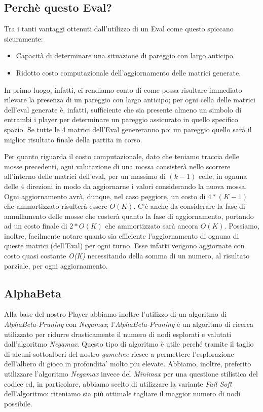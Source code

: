 \documentclass{article}
\begin{document}
\subsection{Perchè questo Eval?}
Tra i tanti vantaggi ottenuti dall'utilizzo di un Eval come questo spiccano sicuramente: 
\begin{itemize}
\item Capacità di determinare una situazione di pareggio con largo anticipo.
\item Ridotto costo computazionale dell'aggiornamento delle matrici generate.
\end{itemize}

In primo luogo, infatti, ci rendiamo conto di come possa risultare immediato rilevare la presenza di un pareggio con largo anticipo; per ogni cella delle matrici dell'eval generate è, infatti, sufficiente che sia presente almeno un simbolo di entrambi i player per determinare un pareggio assicurato in quello specifico spazio.
Se tutte le 4 matrici dell'Eval genereranno poi un pareggio quello sarà il miglior risultato finale della partita in corso.

\medskip

Per quanto riguarda il costo computazionale, dato che teniamo traccia delle mosse precedenti, ogni valutazione di una mossa consisterà nello scorrere all'interno delle matrici dell'eval, per un massimo di $(k-1)$ celle, in ognuna delle 4 direzioni in modo da aggiornarne i valori considerando la nuova mossa. \newline 
Ogni aggiornamento avrà, dunque, nel caso peggiore, un costo di $4 * (K - 1)$ che ammortizzato risulterà essere $O(K)$. \newline
C'è anche da considerare la fase di annullamento delle mosse che costerà quanto la fase di aggiornamento, portando ad un costo finale di $2 * O(K)$ che ammortizzato sarà ancora $O(K)$.\newline
\newline
Possiamo, inoltre, facilmente notare quanto sia efficiente l'aggiornamento di ognuna di queste matrici (dell'Eval) per ogni turno. Esse infatti vengono aggiornate con costo quasi costante \textit{O(K)}
necessitando della somma di un numero, al risultato parziale, per ogni aggiornamento.

\subsection{AlphaBeta}
Alla base del nostro Player abbiamo inoltre l'utilizzo di un algoritmo di \textit{AlphaBeta-Pruning} con \textit{Negamax}; l'\textit{AlphaBeta-Pruning} è un algoritmo di ricerca utilizzato per ridurre drasticamente il numero di nodi esplorati e valutati dall'algoritmo \textit{Negamax}.
Questo tipo di algoritmo è utile perché tramite il taglio di alcuni sottoalberi del nostro \textit{gametree} riesce a permettere l'esplorazione dell'albero di gioco in profondita' molto piu elevate. Abbiamo, inoltre, preferito utilizzare l'algoritmo \textit{Negamax} invece del \textit{Minimax} per una questione stilistica del codice ed, in particolare, abbiamo scelto di utilizzare la variante \textit{Fail Soft} dell'algoritmo: riteniamo sia più ottimale tagliare il maggior numero di nodi possibile.
\end{document}
